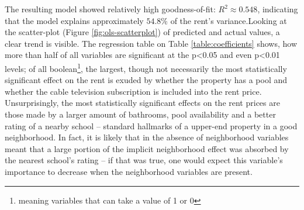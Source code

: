 \documentclass[12pt]{report}
\begin{document}
The resulting model showed relatively high goodness-of-fit: $R^2\approx0.548$, indicating that the model explains approximately $54.8\%$ of the rent's variance.Looking at the scatter-plot (Figure \ref{fig:ols-scatterplot}) of predicted and actual values, a clear trend is visible. The regression table on Table \ref{table:coefficients} shows, how more than half of all variables are significant at the p\textless0.05 and even p\textless0.01 levels; of all boolean\footnote{meaning variables that can take a value of 1 or 0}, the largest, though not necessarily the most statistically significant effect on the rent is exuded by whether the property has a pool and whether the cable television subscription is included into the rent price. Unsurprisingly, the most statistically significant effects on the rent prices are those made by a larger amount of bathrooms, pool availability and a better rating of a nearby school -- standard hallmarks of a upper-end property in a good neighborhood. In fact, it is likely that in the absence of neighborhood variables meant that a large portion of the implicit neighborhood effect was absorbed by the nearest school's rating -- if that was true, one would expect this variable's importance to decrease when the neighborhood variables are present.

\end{document}

